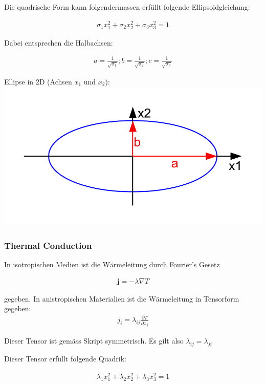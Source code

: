 \documentclass[a4paper]{scrartcl}
\begin{document}
Die quadrische Form kann folgendermassen erfüllt folgende Ellipsoidgleichung:

\begin{align}
\sigma_1x_1^2+\sigma_2x_2^2+\sigma_3x_3^2=1
\end{align}


Dabei entsprechen die Halbachsen:

\begin{align}
a=\frac{1}{\sqrt{\sigma_1}}; b=\frac{1}{\sqrt{\sigma_2}};
c=\frac{1}{\sqrt{\sigma_3}}
\end{align}

\begin{center}
Ellipse in 2D (Achsen $x_1$ und $x_2$):\\
\includegraphics[scale=0.8]{images/quadrik_2d_ellipse.pdf}
\end{center}

\subsubsection{Thermal Conduction}
In isotropischen Medien ist die Wärmeleitung durch Fourier's Gesetz

\begin{align}
\mathbf{j}=-\lambda \nabla T
\end{align}

gegeben. In anistropischen Materialien ist die Wärmeleitung in Tensorform
gegeben:
\begin{align}
j_i=\lambda_{ij}\frac{\partial T}{\partial x_j}
\end{align}

Dieser Tensor ist gemäss Skript symmetrisch. Es gilt also
$\lambda_{ij}=\lambda_{ji}$

Dieser Tensor erfüllt folgende Quadrik:

\begin{align}
\lambda_1 x_1^2+\lambda_2 x_2^2+\lambda_3 x_3^2=1
\end{align}
\end{document}
